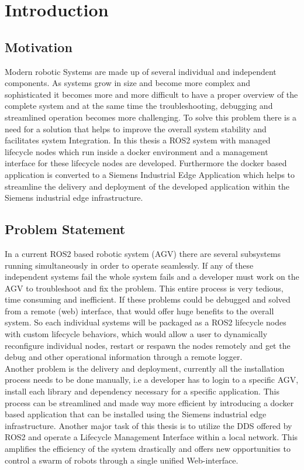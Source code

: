 \chapter{Introduction}
\label{Introduction}

	\section{Motivation}
	\label{Introduction:Motivation}
	Modern robotic Systems are made up of several individual and independent components. As systems grow in size and become more complex and sophisticated it becomes more and more difficult to have a proper overview of the complete system and at the same time the troubleshooting, debugging and streamlined operation becomes more challenging. To solve this problem there is a need for a solution that helps to improve the overall system stability and facilitates system Integration. In this thesis a ROS2 system with managed lifecycle nodes which run inside a docker environment and a management interface for these lifecycle nodes are developed. Furthermore the docker based application is converted to a Siemens Industrial Edge Application which helps to streamline the delivery and deployment of the developed application within the Siemens industrial edge infrastructure.
	
	\section{Problem Statement}
	\label{Introduction:Problem Statement}
	In a current ROS2 based robotic system (AGV) there are several subsystems running simultaneously in order to operate seamlessly. If any of these independent systems fail the whole system fails and a developer must work on the AGV to troubleshoot and fix the problem. This entire process is very tedious, time consuming and inefficient. If these problems could be debugged and solved from a remote (web) interface, that would offer huge benefits to the overall system. So each individual systems will be packaged as a ROS2 lifecycle nodes with custom lifecycle behaviors, which would allow a user to dynamically reconfigure individual nodes, restart or respawn the nodes remotely and get the debug and other operational information through a remote logger.\\

	Another problem is the delivery and deployment, currently all the installation process needs to be done manually, i.e a developer has to login to a specific AGV, install each library and dependency necessary for a specific application. This process can be streamlined and made way more efficient by introducing a docker based application that can be installed using the Siemens industrial edge infrastructure. Another major task of this thesis is to utilize the DDS offered by ROS2 and operate a Lifecycle Management Interface within a local network. This amplifies the efficiency of the system drastically and offers new opportunities to control a swarm of robots through a single unified Web-interface.
	
